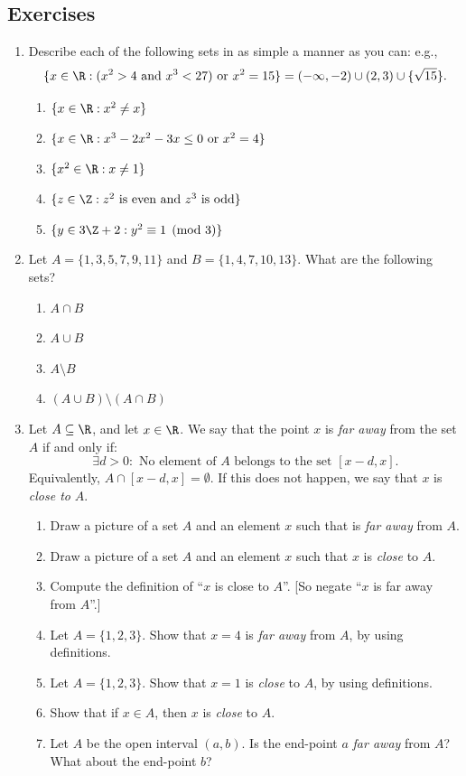 \subsection*{Exercises}

\begin{enumerate}\renewcommand{\labelenumi}{\thesubsection.\theenumi}
  \item Describe each of the following sets in as simple a manner as you can: e.g.,
  \[\{x\in\R:(x^2>4\text{ and } x^3<27)\text{ or } x^2=15\}=(-\infty,-2)\cup (2,3)\cup\{\sqrt{15}\}.\]
	\begin{enumerate}
	  	\item $\{x\in\R:x^2\neq x\}$
	  	\item $\{x\in\R:x^3-2x^2-3x\le 0\text{ or }x^2=4\}$
	  	\item $\{x^2\in\R:x \neq 1\}$
	  	\item $\{z\in\Z:z^2\text{ is even and $z^3$ is odd}\}$
		  \item $\{y\in 3\Z+2:y^2\equiv 1\pmod 3\}$
		\end{enumerate}
  
  \item Let $A=\{1,3,5,7,9,11\}$ and $B=\{1,4,7,10,13\}$. What are the following sets?
    \begin{enumerate}
	  	\item $A\cap B$
	  	\item $A\cup B$
	  	\item $A\setminus B$
	  	\item $(A\cup B)\setminus (A\cap B)$
		\end{enumerate}
	
  	
  \item Let $A\subseteq\R$, and let $x\in\R$. We say that the point $x$ is \emph{far away} from the set $A$ if and only if:
  \[\exists d>0\colon\text{ No element of $A$ belongs to the set $[x-d,x]$}.\]
	Equivalently, $A\cap[x-d,x]=\emptyset$. 
	If this does not happen, we say that $x$ is \emph{close to} $A$.
  	\begin{enumerate}
			\item Draw a picture of a set $A$ and an element $x$ such that is  \emph{far away} from $A$. 
			\item Draw a picture of a set $A$ and an element  $x$  such that $x$ is \emph{close} to $A$.
			\item Compute the definition of ``$x$ is close to $A$''. [So negate ``$x$ is far away from $A$''.]
			\item Let $A=\{1,2,3\}$. Show that $x=4$ is \emph{far away} from $A$, by using definitions.
			\item Let $A=\{1,2,3\}$. Show that $x=1$ is \emph{close} to  $A$, by using definitions.
			\item Show that if $x\in A$, then $x$ is \emph{close} to $A$.
			\item Let $A$ be the open interval $(a,b)$. Is the end-point $a$ \emph{far away} from $A$?  What about the end-point $b$?
  	\end{enumerate}
  	

\end{enumerate}
